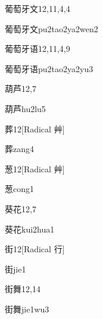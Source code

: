 \begin{entry}{葡萄牙文}{12,11,4,4}
  \begin{phonetics}{葡萄牙文}{pu2tao2ya2wen2}
  \end{phonetics}
\end{entry}

\begin{entry}{葡萄牙语}{12,11,4,9}
  \begin{phonetics}{葡萄牙语}{pu2tao2ya2yu3}
  \end{phonetics}
\end{entry}

\begin{entry}{葫芦}{12,7}
  \begin{phonetics}{葫芦}{hu2lu5}
  \end{phonetics}
\end{entry}

\begin{entry}{葬}{12}[Radical 艸]
  \begin{phonetics}{葬}{zang4}
  \end{phonetics}
\end{entry}

\begin{entry}{葱}{12}[Radical 艸]
  \begin{phonetics}{葱}{cong1}
  \end{phonetics}
\end{entry}

\begin{entry}{葵花}{12,7}
  \begin{phonetics}{葵花}{kui2hua1}
  \end{phonetics}
\end{entry}

\begin{entry}{街}{12}[Radical 行]
  \begin{phonetics}{街}{jie1}
  \end{phonetics}
\end{entry}

\begin{entry}{街舞}{12,14}
  \begin{phonetics}{街舞}{jie1wu3}
  \end{phonetics}
\end{entry}

